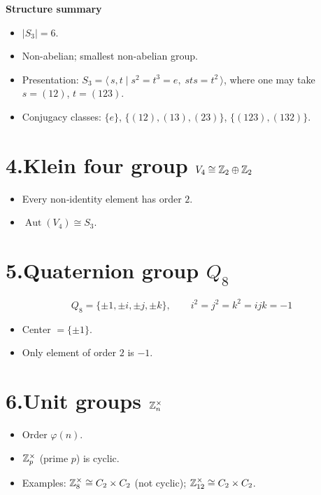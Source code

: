 \documentclass[12pt]{article}
\theoremstyle{definition} %
\theoremstyle{plain} %
\begin{document}
  \smallskip
  \textbf{Structure summary}
  \begin{itemize}
    \item $|S_{3}| = 6$.
    \item Non-abelian; smallest non-abelian group.
    \item Presentation: $\displaystyle S_{3} = \langle\,s,t \mid s^{2}=t^{3}=e,\; sts = t^{2}\,\rangle$,  
          where one may take $s=(12)$, $t=(123)$.
    \item Conjugacy classes:  
          $\{e\}$, \(\{(12),(13),(23)\}\), \(\{(123),(132)\}\).
  \end{itemize}
  \bigskip
  \section*{4.\;Klein four group $V_{4}\cong\Bbb Z_{2}\oplus\Bbb Z_{2}$}
  
  \begin{itemize}
    \item Every non‑identity element has order $2$.
    \item $\operatorname{Aut}(V_{4})\cong S_{3}$.
  \end{itemize}
  
  \bigskip
  \section*{5.\;Quaternion group $Q_{8}$}
  
  \[
     Q_{8}= \{\pm1,\pm i,\pm j,\pm k\},\qquad i^{2}=j^{2}=k^{2}=ijk=-1
  \]
  \begin{itemize}
    \item Center $=\{\pm1\}$.
    \item Only element of order $2$ is $-1$.
  \end{itemize}
  
  \bigskip
  \section*{6.\;Unit groups $\Bbb Z_{n}^{\times}$}
  
  \begin{itemize}
    \item Order $\varphi(n)$.
    \item $\Bbb Z_{p}^{\times}$ (prime $p$) is cyclic.
    \item Examples: $\Bbb Z_{8}^{\times}\cong C_{2}\times C_{2}$ (not cyclic); 
          $\Bbb Z_{12}^{\times}\cong C_{2}\times C_{2}$.
  \end{itemize}
  
\end{document}

